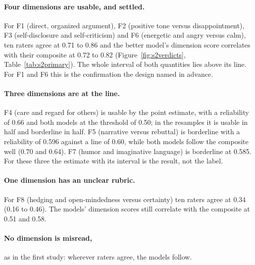\paragraph{Four dimensions are usable, and settled.} For F1 (direct, organized argument), F2 (positive tone
versus disappointment), F3 (self-disclosure and self-criticism) and F6 (energetic and angry versus calm), ten
raters agree at 0.71 to 0.86 and the better model's dimension score correlates with their composite at 0.72 to
0.82 (Figure~\ref{fig:s2verdicts}, Table~\ref{tab:s2primary}). The whole interval of both quantities lies above
its line. For F1 and F6 this is the confirmation the design named in advance.

\paragraph{Three dimensions are at the line.} F4 (care and regard for others) is usable by the point estimate,
with a reliability of 0.66 and both models at the threshold of 0.50; in the resamples it is usable in half and
borderline in half. F5 (narrative versus rebuttal) is borderline with a reliability of 0.596 against a line of
0.60, while both models follow the composite well (0.70 and 0.64). F7 (humor and imaginative language) is
borderline at 0.585. For these three the estimate with its interval is the result, not the label.

\paragraph{One dimension has an unclear rubric.} For F8 (hedging and open-mindedness versus certainty) ten raters
agree at 0.34 (0.16 to 0.46). The models' dimension scores still correlate with the composite at 0.51 and 0.58.

\paragraph{No dimension is misread,} as in the first study: wherever raters agree, the models follow.

\begin{table}[!htb]\centering
\caption{The same with the model's help: the reliability of the composite, each model's correlation with the
consensus of an unlimited panel, and the verdict. Right: the share of people's differences between passages
that lies between recordings, the correlation of the site's recording score with what a panel would say about
the recording, and the plain share.}\label{tab:s2help}

\end{table}

